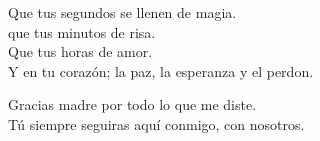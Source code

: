 \begin{flushright}
    Que tus segundos se llenen de magia.\\
    que tus minutos de risa.\\
    Que tus horas de amor.\\
    Y en tu corazón; la paz, la esperanza y el perdon. 

    Gracias madre por todo lo que me diste. \\ 
    Tú siempre seguiras aquí conmigo, con nosotros. 
    	
\end{flushright}